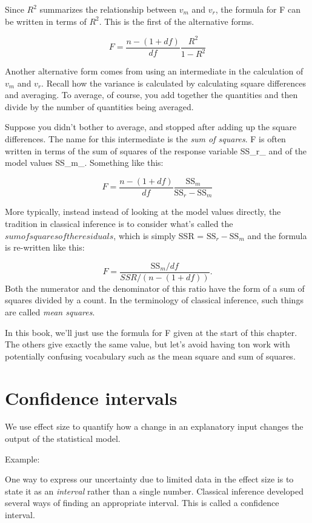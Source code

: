 \documentclass[]{book}
\begin{document}
Since \(R^2\) summarizes the relationship between \(v_m\) and \(v_r\), the formula for F can be written in terms of \(R^2\). This is the first of the alternative forms.

\[F = \frac{n - (1+df)}{df} \frac{R^2}{1 - R^2}\]

Another alternative form comes from using an intermediate in the calculation of \(v_m\) and \(v_r\). Recall how the variance is calculated by calculating square differences and averaging. To average, of course, you add together the quantities and then divide by the number of quantities being averaged.

Suppose you didn't bother to average, and stopped after adding up the square differences. The name for this intermediate is the \emph{sum of squares}.
F is often written in terms of the sum of squares of the response variable SS\_r\_ and of the model values SS\_m\_. Something like this:

\[F = \frac{n - (1+df)}{df} \frac{\mbox{SS}_m}{\mbox{SS}_r - \mbox{SS}_m}\]

More typically, instead instead of looking at the model values directly, the tradition in classical inference is to consider what's called the \(sum of squares of the residuals\), which is simply SSR = \(\mbox{SS}_r - \mbox{SS}_m\) and the formula is re-written like this:

\[F = \frac{\mbox{SS}_m / df}{SSR / (n -  (1+df))}.\]
Both the numerator and the denominator of this ratio have the form of a sum of squares divided by a count. In the terminology of classical inference, such things are called \emph{mean squares}.

In this book, we'll just use the formula for F given at the start of this chapter. The others give exactly the same value, but let's avoid having ton work with potentially confusing vocabulary such as the mean square and sum of squares.

\hypertarget{confidence-intervals}{%
\chapter{Confidence intervals}\label{confidence-intervals}}

We use effect size to quantify how a change in an explanatory input changes the output of the statistical model.

Example:

One way to express our uncertainty due to limited data in the effect size is to state it as an \emph{interval} rather than a single number. Classical inference developed several ways of finding an appropriate interval. This is called a confidence interval.
\end{document}
